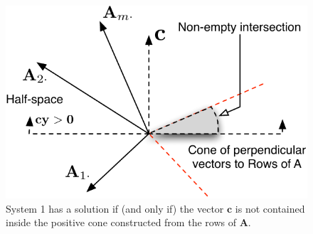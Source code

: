 \begin{figure}[htbp]
\centering
\includegraphics[scale=0.75]{System1.pdf}
\caption{System 1 has a solution if (and only if) the vector $\mathbf{c}$ is not contained inside the positive cone constructed from the rows of $\mathbf{A}$.}
\label{fig:System1}
\end{figure}
